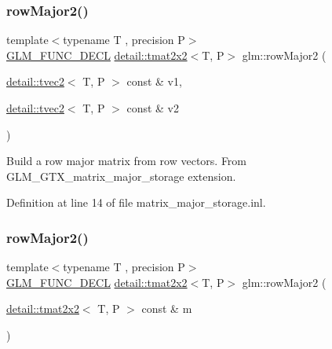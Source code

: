 \subsubsection{\texorpdfstring{row\+Major2()}{rowMajor2()}\hspace{0.1cm}{\footnotesize\ttfamily [1/2]}}
{\footnotesize\ttfamily template$<$typename T , precision P$>$ \\
\hyperlink{setup_8hpp_ab2d052de21a70539923e9bcbf6e83a51}{G\+L\+M\+\_\+\+F\+U\+N\+C\+\_\+\+D\+E\+CL} \hyperlink{structglm_1_1detail_1_1tmat2x2}{detail\+::tmat2x2}$<$T, P$>$ glm\+::row\+Major2 (\begin{DoxyParamCaption}\item[{\hyperlink{structglm_1_1detail_1_1tvec2}{detail\+::tvec2}$<$ T, P $>$ const \&}]{v1,  }\item[{\hyperlink{structglm_1_1detail_1_1tvec2}{detail\+::tvec2}$<$ T, P $>$ const \&}]{v2 }\end{DoxyParamCaption})}

Build a row major matrix from row vectors. From G\+L\+M\+\_\+\+G\+T\+X\+\_\+matrix\+\_\+major\+\_\+storage extension. 

Definition at line 14 of file matrix\+\_\+major\+\_\+storage.\+inl.

\mbox{\label{group__gtx__matrix__major__storage_ga5e3cee7cdc09b9ebf0e072247a5eac54}} 
\subsubsection{\texorpdfstring{row\+Major2()}{rowMajor2()}\hspace{0.1cm}{\footnotesize\ttfamily [2/2]}}
{\footnotesize\ttfamily template$<$typename T , precision P$>$ \\
\hyperlink{setup_8hpp_ab2d052de21a70539923e9bcbf6e83a51}{G\+L\+M\+\_\+\+F\+U\+N\+C\+\_\+\+D\+E\+CL} \hyperlink{structglm_1_1detail_1_1tmat2x2}{detail\+::tmat2x2}$<$T, P$>$ glm\+::row\+Major2 (\begin{DoxyParamCaption}\item[{\hyperlink{structglm_1_1detail_1_1tmat2x2}{detail\+::tmat2x2}$<$ T, P $>$ const \&}]{m }\end{DoxyParamCaption})}

